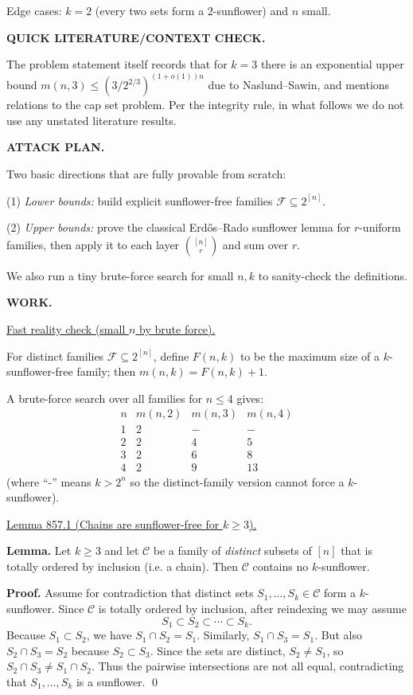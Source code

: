 Edge cases: $k=2$ (every two sets form a $2$-sunflower) and $n$ small.

\medskip
\noindent\textbf{QUICK LITERATURE/CONTEXT CHECK.}

The problem statement itself records that for $k=3$ there is an exponential upper bound $m(n,3) \le (3/2^{2/3})^{(1+o(1))n}$ due to Naslund--Sawin, and mentions relations to the cap set problem. Per the integrity rule, in what follows we do not use any unstated literature results.

\medskip
\noindent\textbf{ATTACK PLAN.}

Two basic directions that are fully provable from scratch:

(1) \emph{Lower bounds:} build explicit sunflower-free families $\mathcal F\subseteq 2^{[n]}$.

(2) \emph{Upper bounds:} prove the classical Erd\H{o}s--Rado sunflower lemma for $r$-uniform families, then apply it to each layer $\binom{[n]}{r}$ and sum over $r$.

We also run a tiny brute-force search for small $n,k$ to sanity-check the definitions.

\medskip
\noindent\textbf{WORK.}

\medskip
\noindent\underline{Fast reality check (small $n$ by brute force).}

For distinct families $\mathcal F\subseteq 2^{[n]}$, define $F(n,k)$ to be the maximum size of a $k$-sunflower-free family; then $m(n,k)=F(n,k)+1$.

A brute-force search over all families for $n\le 4$ gives:
\[
\begin{array}{c|ccc}
 n & m(n,2) & m(n,3) & m(n,4) \\\hline
 1 & 2 & - & - \\
 2 & 2 & 4 & 5 \\
 3 & 2 & 6 & 8 \\
 4 & 2 & 9 & 13
\end{array}
\]
(where ``-'' means $k>2^n$ so the distinct-family version cannot force a $k$-sunflower).

\medskip
\noindent\underline{Lemma 857.1 (Chains are sunflower-free for $k\ge 3$).}

\textbf{Lemma.}
Let $k\ge 3$ and let $\mathcal C$ be a family of \emph{distinct} subsets of $[n]$ that is totally ordered by inclusion (i.e. a chain). Then $\mathcal C$ contains no $k$-sunflower.

\textbf{Proof.}
Assume for contradiction that distinct sets $S_1,\dots,S_k\in\mathcal C$ form a $k$-sunflower. Since $\mathcal C$ is totally ordered by inclusion, after reindexing we may assume
\[
S_1 \subset S_2 \subset \cdots \subset S_k.
\]
Because $S_1\subset S_2$, we have $S_1\cap S_2 = S_1$. Similarly, $S_1\cap S_3=S_1$.
But also $S_2\cap S_3 = S_2$ because $S_2\subset S_3$.
Since the sets are distinct, $S_2\ne S_1$, so $S_2\cap S_3 \ne S_1\cap S_2$.
Thus the pairwise intersections are not all equal, contradicting that $S_1,\dots,S_k$ is a sunflower.
\qed

